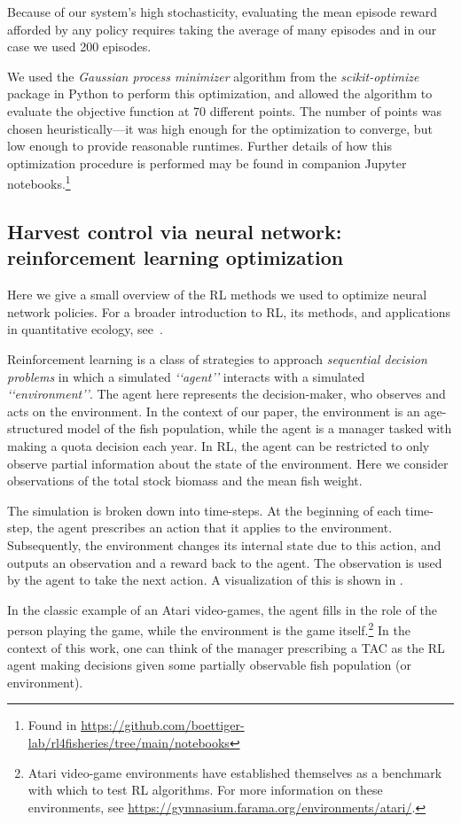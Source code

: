 \documentclass[floatfix,nofootinbib,longbibliography,notitlepage]{revtex4-2}
\begin{document}
Because of our system's high stochasticity, evaluating the mean episode reward afforded by any policy requires taking the average of many episodes and in our case we used 200 episodes. 

We used the \emph{Gaussian process minimizer} algorithm from the \emph{scikit-optimize} package in Python to perform this optimization, and allowed the algorithm to evaluate the objective function at 70 different points. 
The number of points was chosen heuristically—it was high enough for the optimization to converge, but low enough to provide reasonable runtimes. 
Further details of how this optimization procedure is performed may be found in companion Jupyter notebooks.\footnote{
Found in \url{https://github.com/boettiger-lab/rl4fisheries/tree/main/notebooks}
}

\subsection{Harvest control via neural network: reinforcement learning optimization}
\label{sec:rl}

Here we give a small overview of the RL methods we used to optimize neural network policies. 
For a broader introduction to RL, its methods, and applications in quantitative ecology, see~\cite{lapeyrolerie-rl}.

Reinforcement learning is a class of strategies to approach \emph{sequential decision problems} in which a simulated \emph{‘‘agent’’} interacts with a simulated \emph{‘‘environment’’}. 
The agent here represents the decision-maker, who observes and acts on the environment. 
In the context of our paper, the environment is an age-structured model of the fish population, while the agent is a manager tasked with making a quota decision each year. 
In RL, the agent can be restricted to only observe partial information about the state of the environment. 
Here we consider observations of the total stock biomass and the mean fish weight.

The simulation is broken down into time-steps. 
At the beginning of each time-step, the agent prescribes an action that it applies to the environment. 
Subsequently, the environment changes its internal state due to this action, and outputs an observation and a reward back to the agent. 
The observation is used by the agent to take the next action. A visualization of this is shown in \cite[Fig.~1]{lapeyrolerie-rl}.

In the classic example of an Atari video-games, the agent fills in the role of the person playing the game, while the environment is the game itself.\footnote{
Atari video-game environments have established themselves as a benchmark with which to test RL algorithms. For more information on these environments, see \url{https://gymnasium.farama.org/environments/atari/}.
}
In the context of this work, one can think of the manager prescribing a TAC as the RL agent making decisions given some partially observable fish population (or environment).
\end{document}
